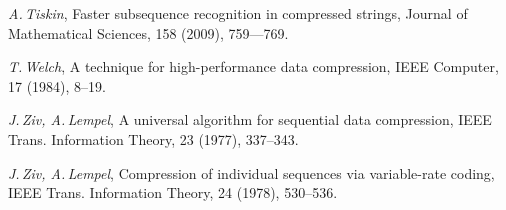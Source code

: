 ﻿\documentclass[11pt]{article}
\theoremstyle{remark}
\begin{document}
\begin{thebibliography}{99}
\textsl{A.\,Tiskin}, Faster subsequence recognition in compressed strings, Journal of Mathematical Sciences, 158 (2009),
759—769.

\textsl{T.\,Welch}, A technique for high-performance data compression, IEEE Computer, 17 (1984), 8--19.

\textsl{J.\,Ziv, A.\,Lempel}, A universal algorithm for sequential data compression, IEEE Trans. Information Theory, 23 (1977), 337--343.

\textsl{J.\,Ziv, A.\,Lempel}, Compression of individual sequences via variable-rate coding, IEEE Trans. Information Theory, 24 (1978),
530--536.

\end{thebibliography}
\end{document}
